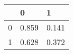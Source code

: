 \begin{table}
\label{tbl:dna_2010}
\begin{tabular}{lll}
\toprule
 & 0 & 1 \\
\midrule
0 & 0.859 & 0.141 \\
1 & 0.628 & 0.372 \\
\bottomrule
\end{tabular}
\end{table}
